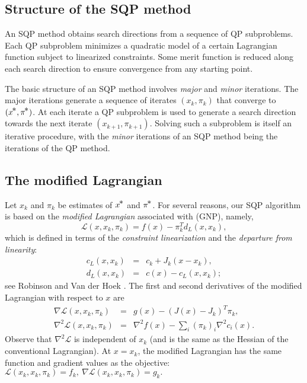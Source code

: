 \documentclass[draft,leqno,onefignum,onetabnum]{siamltex}
\def\disp{\displaystyle}
\def\grad{\nabla}
\def\Hess{\nabla^2}
\def\kp#1{_{k+#1}}
\def\nthinsp{\mskip -2   mu}
\def\Lscr{{\mathcal L}}
\def\pistar{\pi\superstar}
\def\superstar{^{\raise 0.5pt\hbox{$\nthinsp *$}}}
\def\T{^T\!}
\def\xstar{x\superstar}
\def\fk{f_k}
\def\gk{g_k}
\def\ck{c_k}
\def\Jk{J_k}
\def\cL{c_{\scriptscriptstyle L}} %
\def\dL{d_{\scriptscriptstyle L}} %
\def\L {\Lscr}                    %
\begin{document}
 \subsection{Structure of the SQP method}

 An SQP method obtains search directions from a sequence of QP subproblems.  Each QP subproblem minimizes a quadratic
model of a certain Lagrangian function subject to linearized
constraints.  Some merit function is reduced along each search
direction to ensure convergence from any starting point.

 The basic structure of an SQP method involves \emph{major} and
\emph{minor} iterations.  The major iterations generate a sequence of
iterates $(x_k,\pi_k)$ that converge to $(\xstar,\pistar)$.
At each iterate a QP subproblem is used to generate a search direction
towards the next iterate $(x\kp1,\pi\kp1)$.  Solving such a subproblem
is itself an iterative procedure, with the \emph{minor} iterations of an
SQP method being the iterations of the QP method.


 \subsection{The modified Lagrangian}  \label{sec-Lagrangians}

Let $x_k$ and $\pi_k$ be estimates of $\xstar$ and $\pistar$.
For several reasons, our SQP algorithm is based on the
\emph{modified Lagrangian} associated with (GNP), namely,
\begin{equation}                                 \label{eqn-def-ML}
        \L(x,x_k,\pi_k) = f(x) - \pi_k^T \dL(x,x_k),
\end{equation}
which is defined in terms of the \emph{constraint linearization}
and the \emph{departure from linearity}:
\begin{eqnarray*}
        \cL(x,x_k) &=& \ck  + \Jk(x - x_k),
     \\ \dL(x,x_k) &=& c(x) - \cL(x,x_k);
\end{eqnarray*}
see Robinson \cite{Rob72} and Van der Hoek \cite{Van82}.
The first and second derivatives of the modified Lagrangian with
respect to $x$ are
\begin{eqnarray*}
        \grad\L(x,x_k,\pi_k) &=& g(x) - (J(x) - \Jk)\T \pi_k, \\[3pt]
        \Hess\L(x,x_k,\pi_k) &=& \disp \Hess f(x)
                                           - \sum_i (\pi_k)_i \Hess c_i(x).
\end{eqnarray*}
Observe that $\Hess\L$ is independent of $x_k$
(and is the same as the Hessian of the conventional Lagrangian).
At $x = x_k$, the modified Lagrangian has the same function and
gradient values as the objective:
$
           \L(x_k,x_k,\pi_k) = \fk, \ %
     \grad \L(x_k,x_k,\pi_k) = \gk.
$
\end{document}
